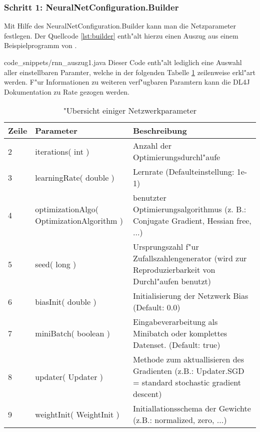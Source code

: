 {\subsubsection{Schritt 1: NeuralNetConfiguration.Builder}
Mit Hilfe des NeuralNetConfiguration.Builder kann man die Netzparameter festlegen. Der Quellcode \ref{lst:builder} enth"alt hierzu einen Auszug aus einem Beispielprogramm von \cite{DL4J}.

{code_snippets/rnn_auszug1.java}
Dieser Code enth"alt lediglich eine Auswahl aller einstellbaren Paramter, welche in der folgenden Tabelle \ref{tbl:beispieltabelle} zeilenweise erkl"art werden. F"ur Informationen zu weiteren verf"ugbaren Paramtern kann die DL4J Dokumentation zu Rate gezogen werden.

\begin{table} [h]
\begin{tabular}{|p{0.8cm}|p{3.7cm}|p{8.8cm}|}\hline
   \textbf{Zeile} & \textbf{Parameter} & \textbf{Beschreibung} \\ \hline
   2 & iterations( int ) & Anzahl der Optimierungsdurchl"aufe \\ \hline
   3 & learningRate( double ) & Lernrate (Defaulteinstellung: 1e-1) \\ \hline
   4 & optimizationAlgo( OptimizationAlgorithm ) & benutzter Optimierungsalgorithmus (z. B.: Conjugate Gradient, Hessian free, ...) \\ \hline
  5 & seed( long ) & Ursprungszahl f"ur Zufallszahlengenerator (wird zur Reproduzierbarkeit von Durchl"aufen benutzt) \\ \hline
  6 & biasInit( double ) & Initialisierung der Netzwerk Bias (Default: 0.0) \\ \hline
  7 & miniBatch( boolean ) & Eingabeverarbeitung als Minibatch oder komplettes Datenset. (Default: true) \\ \hline
  8 & updater( Updater ) & Methode zum aktuallisieren des Gradienten (z.B.: Updater.SGD = standard stochastic gradient descent) \\ \hline
   9 & weightInit( WeightInit ) & Initiallationsschema der Gewichte (z.B.: normalized, zero, ...) \\ \hline
 \end{tabular}
\caption{"Ubersicht einiger Netzwerkparameter}
\label{tbl:beispieltabelle} %
\end{table}

}
